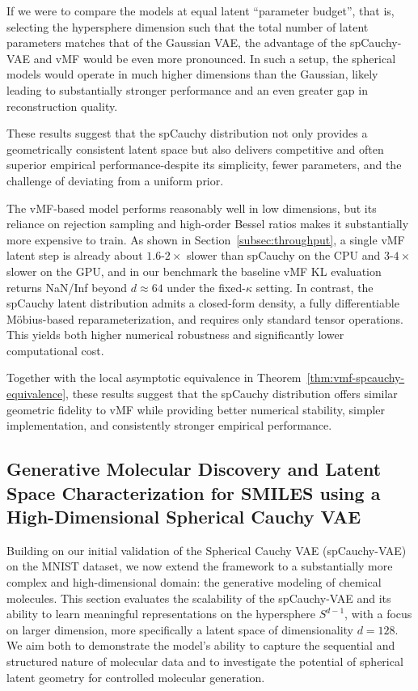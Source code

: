 \documentclass{article}
\begin{document}
If we were to compare the models at equal latent ``parameter budget'', that is, selecting the hypersphere dimension such that the total number of latent parameters matches that of the Gaussian VAE, the advantage of the spCauchy-VAE and vMF would be even more pronounced. In such a setup, the spherical models would operate in much higher dimensions than the Gaussian, likely leading to substantially stronger performance and an even greater gap in reconstruction quality.

These results suggest that the spCauchy distribution not only provides a geometrically consistent latent space but also delivers competitive and often superior empirical performance-despite its simplicity, fewer parameters, and the challenge of deviating from a uniform prior.

The vMF-based model performs reasonably well in low dimensions, but its reliance on rejection sampling and high-order Bessel ratios makes it substantially more expensive to train. As shown in Section~\ref{subsec:throughput}, a single vMF latent step is already about $1.6$-$2\times$ slower than spCauchy on the CPU and $3$-$4\times$ slower on the GPU, and in our benchmark the baseline vMF KL evaluation returns NaN/Inf beyond $d \approx 64$ under the fixed-$\kappa$ setting. In contrast, the spCauchy latent distribution admits a closed-form density, a fully differentiable Möbius-based reparameterization, and requires only standard tensor operations. This yields both higher numerical robustness and significantly lower computational cost. 

Together with the local asymptotic equivalence in Theorem~\ref{thm:vmf-spcauchy-equivalence}, these results suggest that the spCauchy distribution offers similar geometric fidelity to vMF while providing better numerical stability, simpler implementation, and consistently stronger empirical performance.

\subsection{Generative Molecular Discovery and Latent Space Characterization for SMILES using a High-Dimensional Spherical Cauchy VAE}

Building on our initial validation of the Spherical Cauchy VAE (spCauchy-VAE) on the MNIST dataset, we now extend the framework to a substantially more complex and high-dimensional domain: the generative modeling of chemical molecules. This section evaluates the scalability of the spCauchy-VAE and its ability to learn meaningful representations on the hypersphere \( S^{d-1} \), with a focus on larger dimension, more specifically a latent space of dimensionality \( d=128 \). We aim both to demonstrate the model’s ability to capture the sequential and structured nature of molecular data and to investigate the potential of spherical latent geometry for controlled molecular generation.
\end{document}
